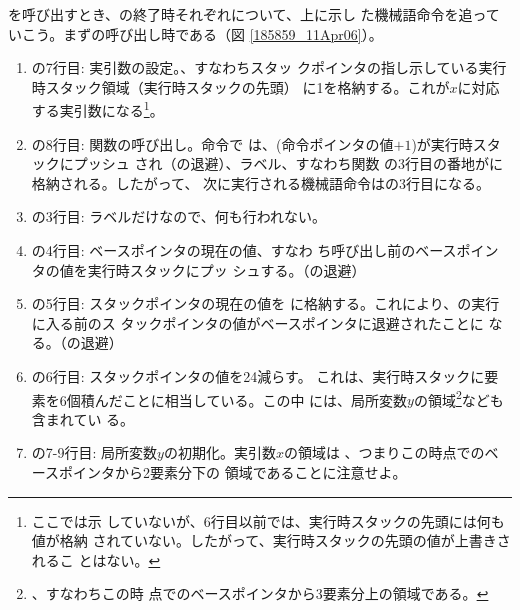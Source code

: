 を呼び出すとき、の終了時それぞれについて、上に示し
た機械語命令を追っていこう。まずの呼び出し時である（図
\ref{185859_11Apr06}）。
\begin{enumerate}
 \item {}の7行目: 実引数の設定。、すなわちスタッ
       クポインタの指し示している実行時スタック領域（実行時スタックの先頭）
       に1を格納する。これが$x$に対応する実引数になる\footnote{ここでは示
       していないが、6行目以前では、実行時スタックの先頭には何も値が格納
       されていない。したがって、実行時スタックの先頭の値が上書きされるこ
       とはない。}。
 \item {}の8行目: 関数の呼び出し。命令で
       は、(命令ポインタの値$+1$)が実行時スタックにプッシュ
       され（の退避）、ラベル、すなわち関数
       の3行目の番地がに格納される。したがって、
       次に実行される機械語命令はの3行目になる。
       \label{181636_11Apr06}
 \item {}の3行目: ラベルだけなので、何も行われない。
 \item {}の4行目: ベースポインタの現在の値、すなわ
       ち呼び出し前のベースポインタの値を実行時スタックにプッ
       シュする。（の退避）
       \label{181349_11Apr06}
 \item {}の5行目: スタックポインタの現在の値を
       に格納する。これにより、の実行に入る前のス
       タックポインタの値がベースポインタに退避されたことに
       なる。（の退避）
       \label{181051_11Apr06}
 \item {}の6行目: スタックポインタの値を24減らす。
       これは、実行時スタックに要素を6個積んだことに相当している。この中
       には、局所変数$y$の領域\footnote{、すなわちこの時
       点でのベースポインタから3要素分上の領域である。}なども含まれてい
       る。
 \item {}の7-9行目: 局所変数$y$の初期化。実引数$x$の領域は
       、つまりこの時点でのベースポインタから2要素分下の
       領域であることに注意せよ。
\end{enumerate}

